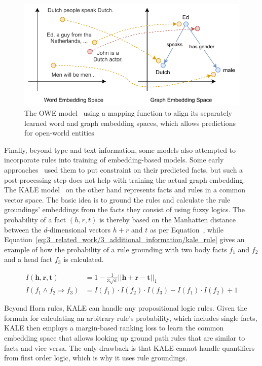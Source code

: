 \begin{figure}[t]
    \centering
    \includegraphics{3_related_work/3_additional_information/owe}
    \caption{The OWE model~\cite{Shah2019AnOE} using a mapping function to align its separately learned word and graph embedding spaces, which allows predictions for open-world entities}
    \label{fig:3_related_work/3_additional_information/owe}
\end{figure}

Finally, beyond type and text information, some models also attempted to incorporate rules into training of embedding-based models. Some early approaches~\cite{Wang2015KnowledgeBC, Wei2015LargescaleKB} used them to put constraint on their predicted facts, but such a post-processing step does not help with training the actual graph embedding. The KALE model~\cite{Guo2016JointlyEK} on the other hand represents facts and rules in a common vector space. The basic idea is to ground the rules and calculate the rule groundings' embeddings from the facts they consist of using fuzzy logics. The probability of a fact $(h, r, t)$ is thereby based on the Manhatten distance between the $d$-dimensional vectors $h + r$ and $t$ as per Equation~\cite{eq:3_related_work/3_additional_information/kale_fac}, while Equation~\ref{eq:3_related_work/3_additional_information/kale_rule} gives an example of how the probability of a rule grounding with two body facts $f_1$ and $f_2$ and a head fact $f_3$ is calculated.

\begin{align}
    I(\textbf{h}, \textbf{r}, \textbf{t}) &= 1 - \frac{1}{3 \sqrt {d}} {|| \textbf{h} + \textbf{r} - \textbf{t} ||}_1
    \label{eq:3_related_work/3_additional_information/kale_fact} \\
    I(f_1 \land f_2 \Rightarrow f_3) &= I(f_1) \cdot I(f_2) \cdot I(f_3) - I(f_1) \cdot I(f_2) + 1
    \label{eq:3_related_work/3_additional_information/kale_rule}
\end{align}

Beyond Horn rules, KALE can handle any propositional logic rules. Given the formula for calculating an arbitrary rule's probability, which includes single facts, KALE then employs a margin-based ranking loss to learn the common embedding space that allows looking up ground path rules that are similar to facts and vice versa. The only drawback is that KALE cannot handle quantifiers from first order logic, which is why it uses rule groundings.
